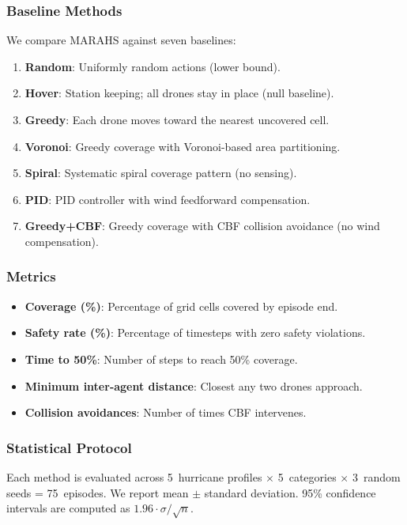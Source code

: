 \documentclass[11pt,twocolumn]{article}
\theoremstyle{definition}
\begin{document}
\subsubsection{Baseline Methods}

We compare MARAHS against seven baselines:

\begin{enumerate}[leftmargin=*, label=\textbf{B\arabic*}]
    \item \textbf{Random}: Uniformly random actions (lower bound).
    \item \textbf{Hover}: Station keeping; all drones stay in place (null baseline).
    \item \textbf{Greedy}: Each drone moves toward the nearest uncovered cell.
    \item \textbf{Voronoi}: Greedy coverage with Voronoi-based area partitioning.
    \item \textbf{Spiral}: Systematic spiral coverage pattern (no sensing).
    \item \textbf{PID}: PID controller with wind feedforward compensation.
    \item \textbf{Greedy+CBF}: Greedy coverage with CBF collision avoidance (no wind compensation).
\end{enumerate}

\subsubsection{Metrics}

\begin{itemize}[leftmargin=*]
    \item \textbf{Coverage (\%)}: Percentage of grid cells covered by episode end.
    \item \textbf{Safety rate (\%)}: Percentage of timesteps with zero safety violations.
    \item \textbf{Time to 50\%}: Number of steps to reach 50\% coverage.
    \item \textbf{Minimum inter-agent distance}: Closest any two drones approach.
    \item \textbf{Collision avoidances}: Number of times CBF intervenes.
\end{itemize}

\subsubsection{Statistical Protocol}

Each method is evaluated across 5~hurricane profiles $\times$ 5~categories $\times$ 3~random seeds = 75~episodes. We report mean $\pm$ standard deviation. 95\% confidence intervals are computed as $1.96 \cdot \sigma / \sqrt{n}$.
\end{document}
